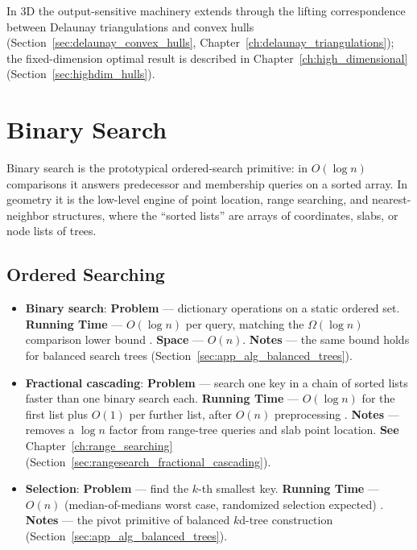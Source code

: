 In 3D the output-sensitive machinery extends through the lifting
correspondence between Delaunay triangulations and convex hulls
(Section~\ref{sec:delaunay_convex_hulls}, Chapter~\ref{ch:delaunay_triangulations});
the fixed-dimension optimal result \cite{chazelle1993} is described in
Chapter~\ref{ch:high_dimensional} (Section~\ref{sec:highdim_hulls}).

\section{Binary Search}
\label{sec:app_alg_binary_search}

Binary search is the prototypical ordered-search primitive: in $O(\log n)$
comparisons it answers predecessor and membership queries on a sorted
array. In geometry it is the low-level engine of point location, range
searching, and nearest-neighbor structures, where the ``sorted lists''
are arrays of coordinates, slabs, or node lists of trees.

\subsection{Ordered Searching}
\label{sec:appalgs_bsearch_ordered}

\begin{itemize}
  \item \textbf{Binary search}: \textbf{Problem} ---
    dictionary operations on a static ordered set. \textbf{Running Time} ---
    $O(\log n)$ per query, matching the $\Omega(\log n)$ comparison lower
    bound \cite{cormen2009}. \textbf{Space} --- $O(n)$.
    \textbf{Notes} --- the same bound holds for balanced search trees
    (Section~\ref{sec:app_alg_balanced_trees}).
  \item \textbf{Fractional cascading}:
    \textbf{Problem} --- search one key in a chain of sorted lists faster
    than one binary search each. \textbf{Running Time} --- $O(\log n)$ for
    the first list plus $O(1)$ per further list, after $O(n)$
    preprocessing \cite{deberg2008}. \textbf{Notes} --- removes a
    $\log n$ factor from range-tree queries and slab point location.
    \textbf{See} Chapter~\ref{ch:range_searching}
    (Section~\ref{sec:rangesearch_fractional_cascading}).
  \item \textbf{Selection}: \textbf{Problem} --- find the
    $k$-th smallest key. \textbf{Running Time} --- $O(n)$ (median-of-medians
    worst case, randomized selection expected) \cite{cormen2009}.
    \textbf{Notes} --- the pivot primitive of balanced $k$d-tree
    construction (Section~\ref{sec:app_alg_balanced_trees}).
\end{itemize}

